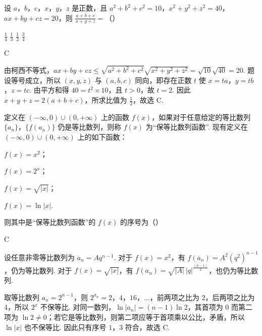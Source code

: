 \begin{problem}
设 \(a\)，\(b\)，\(c\)，\(x\)，\(y\)，\(z\) 是正数，且 \(a^2 + b^2 + c^2 = 10\)，\(x^2 + y^2 + z^2 = 40\)，\(ax + by + cz = 20\)，则 \(\frac{a + b + c}{x + y + z} =\)（\quad）

\choices
    {\( \frac{1}{4} \)}
    {\( \frac{1}{3} \)}
    {\( \frac{1}{2} \)}
    {\( \frac{3}{4} \)}
\end{problem}

\begin{answer}
C
\end{answer}

\begin{solution}
由柯西不等式，\(ax+by+cz\leqslant\sqrt{a^2+b^2+c^2}\sqrt{x^2+y^2+z^2}=\sqrt{10}\sqrt{40}=20\). 题设等号成立，所以 \((x,y,z)\) 与 \((a,b,c)\) 同向，即存在正数 \(t\) 使 \(x=ta\)，\(y=tb\)，\(z=tc\). 由平方和得 \(40=t^2\times10\)，且 \(t>0\)，故 \(t=2\). 因此 \(x+y+z=2(a+b+c)\)，所求比值为 \(\frac12\)，故选 C.
\end{solution}

\begin{problem}
定义在 \((- \infty, 0) \cup (0, +\infty)\) 上的函数 \(f(x)\)，如果对于任意给定的等比数列 \(\{a_n\}\)，\(\{f(a_n)\}\) 仍是等比数列，则称 \(f(x)\) 为“保等比数列函数”. 现有定义在 \((- \infty, 0) \cup (0, +\infty)\) 上的如下函数：

\begin{circlelist}
\item \( f(x)=x^{2} \)；
\item \( f(x)=2^{x} \)；
\item \( f(x)=\sqrt{|x|} \)；
\item \( f(x)=\ln|x| \).
\end{circlelist}

则其中是“保等比数列函数”的 \(f(x)\) 的序号为（\quad）

\choices
    {}
    {}
    {}
    {}
\end{problem}

\begin{answer}
C
\end{answer}

\begin{solution}
设任意非零等比数列为 \(a_n=Aq^{n-1}\). 对于 \(f(x)=x^2\)，有 \(f(a_n)=A^2(q^2)^{n-1}\)，仍为等比数列. 对于 \(f(x)=\sqrt{|x|}\)，有 \(f(a_n)=\sqrt{|A|}\,|q|^{\frac{(n-1)}{2}}\)，也仍为等比数列.

取等比数列 \(a_n=2^{n-1}\)，则 \(2^{a_n}=2\)，\(4\)，\(16\)，\(\ldots\)，前两项之比为 \(2\)，后两项之比为 \(4\)，所以 \(2^x\) 不保等比. 对同一数列，\(\ln|a_n|=(n-1)\ln2\)，其首项为 \(0\) 而第二项为 \(\ln2\neq0\)；若它是等比数列，则第二项应等于首项乘以公比，矛盾，所以 \(\ln|x|\) 也不保等比. 因此只有序号 \(1\)，\(3\) 符合，故选 C.
\end{solution}

